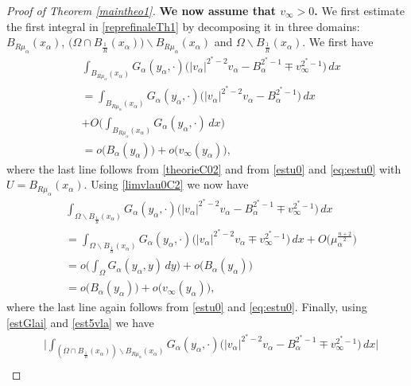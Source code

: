 \documentclass[10pt]{amsart}
\numberwithin{equation}{section}
\newcommand{\Om}{\Omega}
\newcommand{\ma}{\mu_\alpha}
\def \ma{\mu_{\alpha}}
\theoremstyle{plain}
\theoremstyle{remark}
\begin{document}
\begin{proof}[Proof of Theorem \ref{maintheo1}]
\textbf{We now assume that $v_\infty > 0$.} We first estimate the first integral in \eqref{reprefinaleTh1} by decomposing it in three domains: $B_{R\ma}(x_\alpha)$, $\big( \Om \cap B_{\frac{1}{R}}(x_\alpha)\big)\backslash B_{R\ma}(x_\alpha)$ and $\Om \backslash B_{\frac{1}{R}}(x_\alpha)$. We first have 
\begin{equation} \label{theorieC03}
 \begin{aligned}
& \int_{B_{R \ma}(x_\alpha)} G_\alpha(y_\alpha, \cdot)\Big( |v_\alpha|^{2^*-2} v_\alpha - B_\alpha^{2^*-1}  \mp v_\infty^{2^*-1} \Big)\, dx \\
&  =  \int_{B_{R \ma}(x_\alpha)} G_\alpha(y_\alpha, \cdot)\Big( |v_\alpha|^{2^*-2} v_\alpha - B_\alpha^{2^*-1}  \Big)\, dx \\
& + O \Big(  \int_{B_{R \ma}(x_\alpha)} G_\alpha(y_\alpha, \cdot) \, dx \Big)\\
& = o \big( B_\alpha(y_\alpha) \big) + o\big( v_\infty(y_\alpha) \big), 
\end{aligned} \end{equation}
where the last line follows from \eqref{theorieC02} and from \eqref{estu0} and \eqref{eq:estu0} with $U = B_{R \ma}(x_\alpha)$. Using \eqref{limvlau0C2} we now have 
\begin{equation} \label{theorieC04}
 \begin{aligned}
& \int_{\Om \backslash B_{\frac{1}{R}}(x_\alpha)} G_\alpha(y_\alpha, \cdot)\Big( |v_\alpha|^{2^*-2} v_\alpha - B_\alpha^{2^*-1} \mp v_\infty^{2^*-1}   \Big)\, dx \\
&  =  \int_{\Om \backslash B_{\frac{1}{R}}(x_\alpha)} G_\alpha(y_\alpha, \cdot)\Big( |v_\alpha|^{2^*-2} v_\alpha  \mp v_\infty^{2^*-1} \Big)\, dx + O \big( \ma^{\frac{n+2}{2}} \big) \\
& = o \Big( \int_{\Om } G_\alpha(y_\alpha, y) \, dy \Big) + o \big(B_\alpha(y_\alpha) \big)  \\
& = o \big(B_\alpha(y_\alpha) \big)+ o\big( v_\infty(y_\alpha) \big), 
\end{aligned} \end{equation}
where the last line again follows from \eqref{estu0} and \eqref{eq:estu0}. Finally, using \eqref{estGlai} and  \eqref{est5vla} we have 
\begin{equation} \label{theorieC05}
 \begin{aligned}
&\Big| \int_{ (\Om \cap B_{\frac{1}{R}}(x_\alpha))\backslash B_{R\ma}(x_\alpha)} G_\alpha(y_\alpha, \cdot)\Big( |v_\alpha|^{2^*-2} v_\alpha - B_\alpha^{2^*-1} \mp v_\infty^{2^*-1}   \Big)\, dx \Big| \\

\end{aligned}
\end{equation}
\end{proof}
\end{document}
